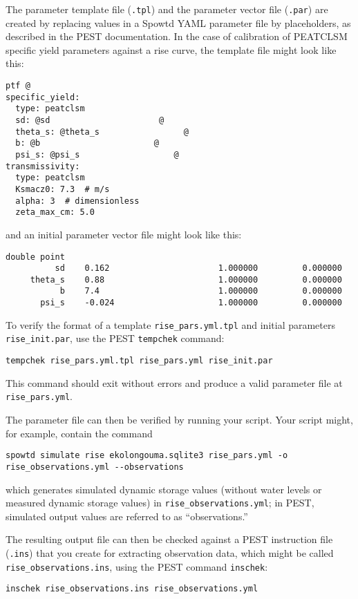 \documentclass[11pt,a4paper]{article}
\begin{document}
The parameter template file (\texttt{.tpl}) and the parameter vector
file (\texttt{.par}) are created by replacing values in a Spowtd YAML
parameter file by placeholders, as described in the PEST
documentation.  In the case of calibration of PEATCLSM specific yield
parameters against a rise curve, the template file might look like this:
\begin{lstlisting}[frame=single]
ptf @
specific_yield:
  type: peatclsm
  sd: @sd                      @
  theta_s: @theta_s                 @
  b: @b                       @
  psi_s: @psi_s                   @
transmissivity:
  type: peatclsm
  Ksmacz0: 7.3  # m/s
  alpha: 3  # dimensionless
  zeta_max_cm: 5.0
\end{lstlisting}
and an initial parameter vector file might look like this:
\begin{lstlisting}[frame=single]
double point
          sd    0.162                      1.000000         0.000000
     theta_s    0.88                       1.000000         0.000000
           b    7.4                        1.000000         0.000000
       psi_s    -0.024                     1.000000         0.000000
\end{lstlisting}

To verify the format of a template \texttt{rise\_pars.yml.tpl} and
initial parameters \texttt{rise\_init.par}, use the PEST
\texttt{tempchek} command:
\begin{lstlisting}[frame=single]
tempchek rise_pars.yml.tpl rise_pars.yml rise_init.par
\end{lstlisting}
This command should exit without errors and produce a valid parameter
file at \texttt{rise\_pars.yml}.

The parameter file can then be verified by running your script.  Your
script might, for example, contain the command
\begin{lstlisting}[frame=single]
spowtd simulate rise ekolongouma.sqlite3 rise_pars.yml -o rise_observations.yml --observations
\end{lstlisting}
which generates simulated dynamic storage values (without water levels
or measured dynamic storage values) in
\texttt{rise\_observations.yml}; in PEST, simulated output values are
referred to as ``observations.''

The resulting output file can then be checked against a PEST
instruction file (\texttt{.ins}) that you create for extracting
observation data, which might be called
\texttt{rise\_observations.ins}, using the PEST command
\texttt{inschek}:
\begin{lstlisting}[frame=single]
inschek rise_observations.ins rise_observations.yml
\end{lstlisting}
\end{document}
